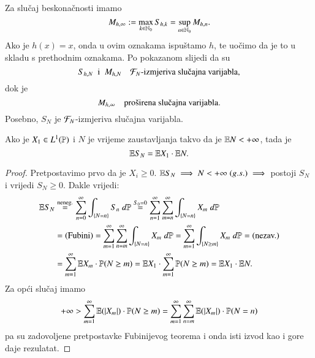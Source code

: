 Za slu\v caj beskona\v cnosti imamo
\begin{equation*}
    M_{h, \infty} := \max\limits_{k \in \mathbb{N}_0} S_{h, k} = \sup\limits_{n \in \mathbb{N}_0} M_{h, n}.
\end{equation*}
Ako je $h(x) = x$, onda u ovim oznakama ispu\v stamo $h$, te uo\v cimo da je to u skladu s prethodnim oznakama.
Po pokazanom slijedi da su
\begin{equation}    \label{jed:15.7}
    S_{h, N} \; \textnormal{ i } \; M_{h, N} \quad \famF_N \textnormal{-izmjeriva slu\v cajna varijabla},
\end{equation}
dok je
\begin{equation}    \label{jed:15.8}
    M_{h, \infty} \quad \textnormal{pro\v sirena slu\v cajna varijabla}.
\end{equation}
Posebno, $S_N$ je $\mathcal{F}_N$-izmjeriva slu\v cajna varijabla.

\begin{tm}  \label{tm:15.9}
    Ako je $X_1 \in L^1(\mathbb{P})$ i $N$ je vrijeme zaustavljanja takvo da je $\mathbb{E} N < +\infty$, tada je
    \begin{equation*}
        \mathbb{E} S_N = \mathbb{E} X_1 \cdot \mathbb{E} N.
    \end{equation*}
\end{tm}

\begin{proof}
    Pretpostavimo prvo da je $X_i \geq 0$.
    $\mathbb{E} S_N \implies N < +\infty \; (g.s.) \implies$ postoji $S_N$ i vrijedi $S_N \geq 0$.
    Dakle vrijedi:
    \begin{equation*}
        \begin{aligned}
            \mathbb{E} S_N & \overset{\textnormal{neneg.}}{=} \sum\limits_{n = 0}^{\infty} \int_{\{ N = n \}} S_n \; d \mathbb{P} \overset{S_0 = 0}{=} \sum\limits_{n = 1}^{\infty} \sum\limits_{m = n}^{\infty} \int_{\{ N = n \}} X_m \; d \mathbb{P}\\
            &= (\textnormal{Fubini}) = \sum\limits_{m = 1}^{\infty} \sum\limits_{n = m}^{\infty} \int_{\{ N = n \}} X_m \; d \mathbb{P} = \sum\limits_{m = 1}^{\infty} \int_{\{ N \geq m \}} X_m \; d \mathbb{P} = (\textnormal{nezav.})\\
            &= \sum\limits_{m = 1}^{\infty} \mathbb{E} X_m \cdot \mathbb{P} (N \geq m) = \mathbb{E} X_1 \cdot \sum\limits_{m = 1}^{\infty} \mathbb{P} (N \geq m) = \mathbb{E} X_1 \cdot \mathbb{E} N.
        \end{aligned}
    \end{equation*}
    Za op\' ci slu\v caj imamo
    \begin{equation*}
        + \infty > \sum\limits_{m = 1}^{\infty} \mathbb{E} (| X_m |) \cdot \mathbb{P} (N \geq m) = \sum\limits_{m = 1}^{\infty} \sum\limits_{n = m}^{\infty} \mathbb{E} (|X_m|) \cdot \mathbb{P} (N = n)
    \end{equation*}
    pa su zadovoljene pretpostavke Fubinijevog teorema i onda isti izvod kao i gore daje rezulatat.
\end{proof}

